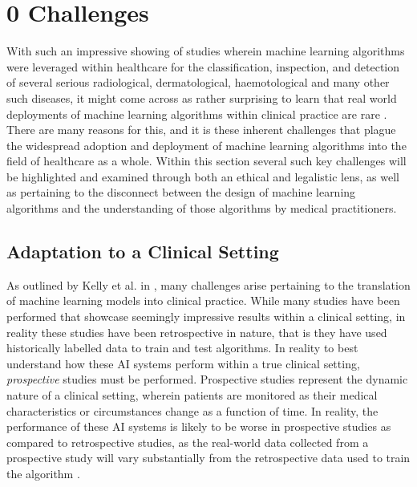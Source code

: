 \documentclass[12pt]{article}
\begin{document}
\setcounter{section}{2}
\section{\hspace{-3mm} 0 Challenges}

With such an impressive showing of studies wherein machine learning algorithms were leveraged within healthcare for the classification, 
inspection, and detection of several serious radiological, dermatological, haemotological and many other such diseases, it might come across as rather
surprising to learn that real world deployments of machine learning algorithms within clinical practice are rare \citep{Kelly_2019}. There are many reasons for this,
and it is these inherent challenges that plague the widespread adoption and deployment of machine learning algorithms into the field of healthcare as a whole. Within this section
several such key challenges will be highlighted and examined through both an ethical and legalistic lens, as well as pertaining to the disconnect between the design of machine learning algorithms 
and the understanding of those algorithms by medical practitioners. \

\vspace{-5mm}
\subsection{Adaptation to a Clinical Setting}

As outlined by Kelly et al. in \citep{Kelly_2019}, many challenges arise pertaining to the translation of machine learning models into clinical practice. While many studies have been performed that showcase 
seemingly impressive results within a clinical setting, in reality these studies have been retrospective in nature, that is they have used historically labelled data to train and test algorithms. In reality 
to best understand how these AI systems perform within a true clinical setting, \textit{prospective} studies must be performed. Prospective studies represent the dynamic nature of a clinical setting,
wherein patients are monitored as their medical characteristics or circumstances change as a function of time. In reality, the performance of these AI systems is likely to be worse in prospective studies 
as compared to retrospective studies, as the real-world data collected from a prospective study will vary substantially from the retrospective data used to train the algorithm \citep{Kelly_2019}. \
\end{document}
